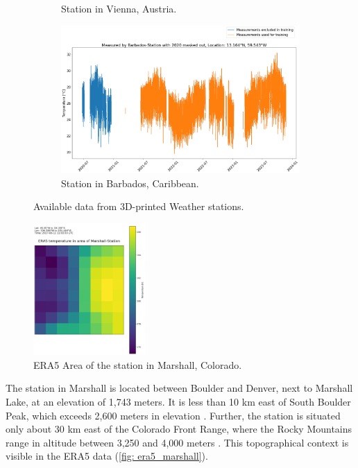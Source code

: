 \begin{figure}
\begin{subfigure}{0.672\textwidth}
\caption{Station in Vienna, Austria.}
\label{fig: available_measurements_vienna}
\end{subfigure}
\begin{subfigure}{0.672\textwidth}
\includegraphics[width=\textwidth]{resources/images/charts/barbados_available_measurements.png}
\caption{Station in Barbados, Caribbean.}
\label{fig: available_measurements_barbados}
\end{subfigure}
\caption{Available data from 3D-printed Weather stations.}
\label{fig: weather_stations}
\end{figure}

\begin{figure}
\centering
\includegraphics[width=0.38\textwidth]{resources/images/Marshall_era5.png}
\caption{ERA5 Area of the station in Marshall, Colorado.}
\label{fig: era5_marshall}
\end{figure}

The station in Marshall is located between Boulder and Denver, next to Marshall Lake, at an elevation of 1,743 meters. It is less than 10 km east of South Boulder Peak, which exceeds 2,600 meters in elevation \cite{southboulderpeak}.
Further, the station is situated only about 30 km east of the Colorado Front Range, where the Rocky Mountains range in altitude between 3,250 and 4,000 meters \cite{Williams1996}.
This topographical context is visible in the ERA5 data (\autoref{fig: era5_marshall}).

